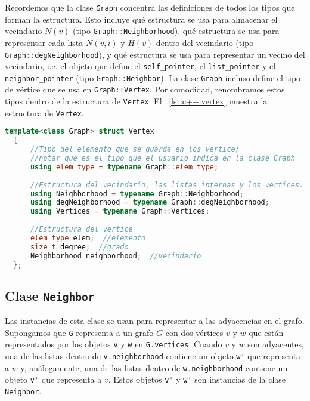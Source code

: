 \documentclass[%
    a4paper,%
    fontsize=12pt,%
    DIV=12,
    twoside,%
    openright,%
    titlepage=true,%
    headsepline,%
    toc=bibliography,%
    parskip=half,%
    cleardoublepage=empty,%
    headings=big,%
]{scrbook}
\makeatletter
\newcommand{\Code}[1]{\lstinline[basicstyle={\ttfamily}]@#1@}
\newcommand{\CPPCode}[1]{\lstinline[language=C++,basicstyle={\ttfamily}]@#1@}
\DeclareRobustCommand{\CPP}{C\nolinebreak[4]\hspace{-.05em}\raisebox{.4ex}{\relsize{-3}\textbf{++}}\xspace}
\def\CPP{C++}%
\makeatother
\begin{document}
Recordemos que la clase \Code{Graph} concentra las definiciones de todos los tipos que forman la estructura.  Esto incluye qué estructura se usa para almacenar el vecindario $N(v)$ (tipo \CPPCode{Graph::Neighborhood}), qué estructura se usa para representar cada lista $N(v, i)$ y $H(v)$ dentro del vecindario (tipo \CPPCode{Graph::degNeighborhood}), y qué estructura se usa para representar un vecino del vecindario, i.e. el objeto que define el \CPPCode{self_pointer}, el \CPPCode{list_pointer} y el \CPPCode{neighbor_pointer} (tipo \Code{Graph::Neighbor}).  La clase \CPPCode{Graph} incluso define el tipo de vértice que se usa en \CPPCode{Graph::Vertex}.  Por comodidad, renombramos estos tipos dentro de la estructura de \CPPCode{Vertex}.  El \lstlistingname~\ref{lst:c++:vertex} muestra la estructura de \CPPCode{Vertex}.

\begin{lstlisting}[language={C++},caption={Estructura del tipo Vertex en \CPP.},gobble=2,float=ht,label={lst:c++:vertex}]
  template<class Graph> struct Vertex
  {
      //Tipo del elemento que se guarda en los vertice;
      //notar que es el tipo que el usuario indica en la clase Graph
      using elem_type = typename Graph::elem_type;
  
      //Estructura del vecindario, las listas internas y los vertices.
      using Neighborhood = typename Graph::Neighborhood;
      using degNeighborhood = typename Graph::degNeighborhood;
      using Vertices = typename Graph::Vertices;
      
      //Estructura del vertice
      elem_type elem;  //elemento
      size_t degree;  //grado
      Neighborhood neighborhood;  //vecindario
  };
\end{lstlisting}

\subsection{Clase \texorpdfstring{\protect\CPPCode{Neighbor}}{Neighbor}}
\label{sec:c++:estructura:Neighbor.h}

Las instancias de esta clase se usan para representar a las adyacencias en el grafo.  Supongamos que \CPPCode{G} representa a un grafo $G$ con dos vértices $v$ y $w$ que están representados por los objetos \CPPCode{v} y \CPPCode{w} en \CPPCode{G.vertices}.  Cuando $v$ y $w$ son adyacentes, una de las listas dentro de \CPPCode{v.neighborhood} contiene un objeto \CPPCode{w'} que representa a $w$ y, análogamente, una de las listas dentro de \CPPCode{w.neighborhood} contiene un objeto \CPPCode{v'} que representa a $v$.  Estos objetos \CPPCode{v'} y \CPPCode{w'} son instancias de la clase \CPPCode{Neighbor}.  
\end{document}
